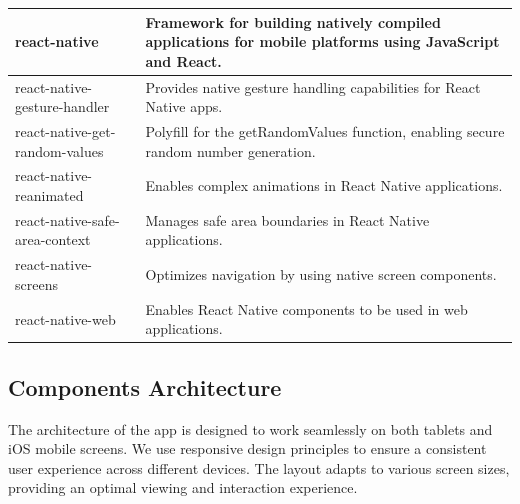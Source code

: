 \begin{longtable}{|p{4cm}|p{10cm}|}
\hline
react-native & Framework for building natively compiled applications for mobile platforms using JavaScript and React. \\
\hline
react-native-gesture-handler & Provides native gesture handling capabilities for React Native apps. \\
\hline
react-native-get-random-values & Polyfill for the getRandomValues function, enabling secure random number generation. \\
\hline
react-native-reanimated & Enables complex animations in React Native applications. \\
\hline
react-native-safe-area-context & Manages safe area boundaries in React Native applications. \\
\hline
react-native-screens & Optimizes navigation by using native screen components. \\
\hline
react-native-web & Enables React Native components to be used in web applications. \\
\hline
\end{longtable}

\subsection{Components Architecture}

The architecture of the app is designed to work seamlessly on both tablets and iOS mobile screens. We use responsive design principles to ensure a consistent user experience across different devices. The layout adapts to various screen sizes, providing an optimal viewing and interaction experience.

